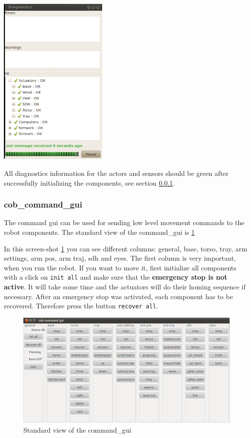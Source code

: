 \begin{center}
\includegraphics[width=0.4\textwidth]{images/diagnostics.png}
\end{center}

All diagnostics information for the actors and sensors should be green after successfully initializing the components, see section \ref{subsec:command_gui}.

\subsubsection{cob\_command\_gui}\label{subsec:command_gui}
The command gui can be used for sending low level movement commands to the robot components. The standard view of the command\_gui is \ref{commandgui}

In this screen-shot \ref{commandgui} you can see different columns: general, base, torso, tray, arm settings, arm pos, arm traj, sdh and eyes. The first column is very important, when you run the robot. If you want to move it, first initialize all components with a click on \texttt{init all} and make sure that the \textbf{emergency stop is not active}. It will take some time and the actuators will do their homing sequence if necessary. After an emergency stop was activated, each component has to be recovered. Therefore press the button \texttt{recover all}. 

\begin{figure}[ht]
\centering
 \includegraphics[width=1\textwidth]{images/cob_command_gui.png}
 \caption{Standard view of the command\_gui}
 \label{commandgui}
\end{figure}

